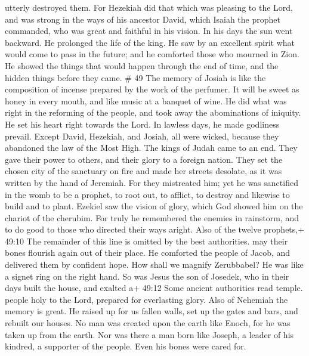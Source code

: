 utterly destroyed them.  For Hezekiah did that which was
pleasing to the Lord, and was strong in the ways of his ancestor David,
which Isaiah the prophet commanded, who was great and faithful in his
vision.  In his days the sun went backward. He prolonged
the life of the king.  He saw by an excellent spirit what
would come to pass in the future; and he comforted those who mourned in
Zion.  He showed the things that would happen through the
end of time, and the hidden things before they came. \# 49 
The memory of Josiah is like the composition of incense prepared by the
work of the perfumer. It will be sweet as honey in every mouth, and like
music at a banquet of wine.  He did what was right in the
reforming of the people, and took away the abominations of iniquity.
 He set his heart right towards the Lord. In lawless days,
he made godliness prevail.  Except David, Hezekiah, and
Josiah, all were wicked, because they abandoned the law of the Most
High. The kings of Judah came to an end.  They gave their
power to others, and their glory to a foreign nation.  They
set the chosen city of the sanctuary on fire and made her streets
desolate, as it was written by the hand of Jeremiah.  For
they mistreated him; yet he was sanctified in the womb to be a prophet,
to root out, to afflict, to destroy and likewise to build and to plant.
 Ezekiel saw the vision of glory, which God showed him on
the chariot of the cherubim.  For truly he remembered the
enemies in rainstorm, and to do good to those who directed their ways
aright.  Also of the twelve prophets,+ 49:10 The remainder
of this line is omitted by the best authorities. may their bones
flourish again out of their place. He comforted the people of Jacob, and
delivered them by confident hope.  How shall we magnify
Zerubbabel? He was like a signet ring on the right hand. 
So was Jesus the son of Josedek, who in their days built the house, and
exalted a+ 49:12 Some ancient authorities read temple. people holy to
the Lord, prepared for everlasting glory.  Also of Nehemiah
the memory is great. He raised up for us fallen walls, set up the gates
and bars, and rebuilt our houses.  No man was created upon
the earth like Enoch, for he was taken up from the earth. 
Nor was there a man born like Joseph, a leader of his kindred, a
supporter of the people. Even his bones were cared for. 

